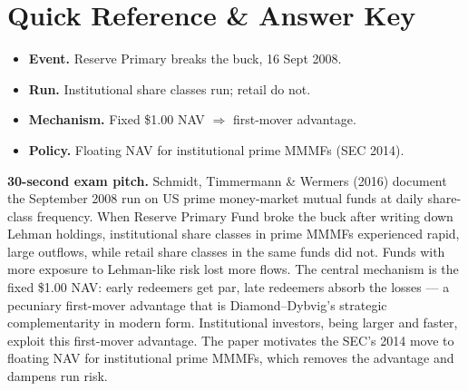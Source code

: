 \documentclass[11pt]{article}
\begin{document}
\section*{Quick Reference \& Answer Key}
\begin{answerbox}
\begin{itemize}
\item \textbf{Event.} Reserve Primary breaks the buck, 16 Sept 2008.
\item \textbf{Run.} Institutional share classes run; retail do not.
\item \textbf{Mechanism.} Fixed \$1.00 NAV $\Rightarrow$ first-mover advantage.
\item \textbf{Policy.} Floating NAV for institutional prime MMMFs (SEC 2014).
\end{itemize}
\end{answerbox}

\begin{keybox}
\textbf{30-second exam pitch.} Schmidt, Timmermann \& Wermers (2016) document the September 2008 run on US prime money-market mutual funds at daily share-class frequency. When Reserve Primary Fund broke the buck after writing down Lehman holdings, institutional share classes in prime MMMFs experienced rapid, large outflows, while retail share classes in the same funds did not. Funds with more exposure to Lehman-like risk lost more flows. The central mechanism is the fixed \$1.00 NAV: early redeemers get par, late redeemers absorb the losses --- a pecuniary first-mover advantage that is Diamond--Dybvig's strategic complementarity in modern form. Institutional investors, being larger and faster, exploit this first-mover advantage. The paper motivates the SEC's 2014 move to floating NAV for institutional prime MMMFs, which removes the advantage and dampens run risk.
\end{keybox}
\end{document}
